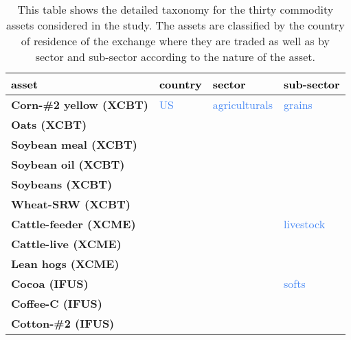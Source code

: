\documentclass[
  authoryear,
  preprint,
  3p]{elsarticle}
\begin{document}
\begin{longtable}[t]{>{}l>{}l>{}l>{}l}

\caption{\label{tbl-assets-taxonomy}This table shows the detailed
taxonomy for the thirty commodity assets considered in the study. The
assets are classified by the country of residence of the exchange where
they are traded as well as by sector and sub-sector according to the
nature of the asset.}

\tabularnewline

\toprule
\textcolor{black}{\textbf{asset}} & \textcolor{black}{\textbf{country}} & \textcolor{black}{\textbf{sector}} & \textcolor{black}{\textbf{sub-sector}}\\
\midrule
\textbf{Corn-\#2 yellow (XCBT)} & \textcolor[HTML]{4285f4}{US} & \textcolor[HTML]{4285f4}{agriculturals} & \textcolor[HTML]{4285f4}{grains}\\
\textbf{Oats (XCBT)} & \textcolor[HTML]{4285f4}{} & \textcolor[HTML]{4285f4}{} & \textcolor[HTML]{4285f4}{}\\
\textbf{Soybean meal (XCBT)} & \textcolor[HTML]{4285f4}{} & \textcolor[HTML]{4285f4}{} & \textcolor[HTML]{4285f4}{}\\
\textbf{Soybean oil (XCBT)} & \textcolor[HTML]{4285f4}{} & \textcolor[HTML]{4285f4}{} & \textcolor[HTML]{4285f4}{}\\
\textbf{Soybeans (XCBT)} & \textcolor[HTML]{4285f4}{} & \textcolor[HTML]{4285f4}{} & \textcolor[HTML]{4285f4}{}\\
\addlinespace
\textbf{Wheat-SRW (XCBT)} & \textcolor[HTML]{4285f4}{} & \textcolor[HTML]{4285f4}{} & \textcolor[HTML]{4285f4}{}\\
\textbf{Cattle-feeder (XCME)} & \textcolor[HTML]{4285f4}{} & \textcolor[HTML]{4285f4}{} & \textcolor[HTML]{4285f4}{livestock}\\
\textbf{Cattle-live (XCME)} & \textcolor[HTML]{4285f4}{} & \textcolor[HTML]{4285f4}{} & \textcolor[HTML]{4285f4}{}\\
\textbf{Lean hogs (XCME)} & \textcolor[HTML]{4285f4}{} & \textcolor[HTML]{4285f4}{} & \textcolor[HTML]{4285f4}{}\\
\textbf{Cocoa (IFUS)} & \textcolor[HTML]{4285f4}{} & \textcolor[HTML]{4285f4}{} & \textcolor[HTML]{4285f4}{softs}\\
\addlinespace
\textbf{Coffee-C (IFUS)} & \textcolor[HTML]{4285f4}{} & \textcolor[HTML]{4285f4}{} & \textcolor[HTML]{4285f4}{}\\
\textbf{Cotton-\#2 (IFUS)} & \textcolor[HTML]{4285f4}{} & \textcolor[HTML]{4285f4}{} & \textcolor[HTML]{4285f4}{}\\

\end{longtable}
\end{document}

